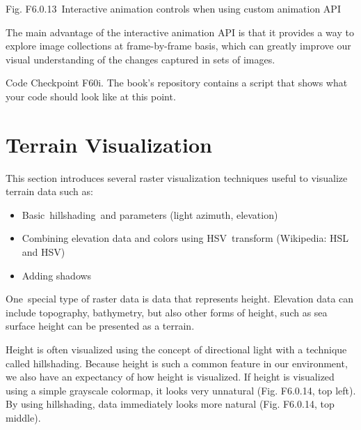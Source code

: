 \documentclass[
  letterpaper,
  DIV=11,
  numbers=noendperiod]{scrreprt}
\providecommand{\tightlist}{%
  \setlength{\itemsep}{0pt}\setlength{\parskip}{0pt}}\usepackage{longtable,booktabs,array}
\begin{document}
Fig. F6.0.13~Interactive animation controls when using custom animation
API

The main advantage of the interactive animation API is that it provides
a way to explore image collections at frame-by-frame basis, which can
greatly improve our visual understanding of the changes captured in sets
of images.

\begin{tcolorbox}[enhanced jigsaw, left=2mm, breakable, rightrule=.15mm, opacityback=0, colframe=quarto-callout-note-color-frame, colbacktitle=quarto-callout-note-color!10!white, arc=.35mm, opacitybacktitle=0.6, toptitle=1mm, colback=white, leftrule=.75mm, title=\textcolor{quarto-callout-note-color}{\faInfo}\hspace{0.5em}{Note}, toprule=.15mm, bottomtitle=1mm, titlerule=0mm, bottomrule=.15mm, coltitle=black]

Code Checkpoint F60i. The book's repository contains a script that shows
what your code should look like at this point.

\end{tcolorbox}

\hypertarget{terrain-visualization}{%
\section{Terrain Visualization}\label{terrain-visualization}}

This section introduces several raster visualization techniques useful
to visualize terrain data such as:

\begin{itemize}
\tightlist
\item
  Basic~hillshading~and parameters (light azimuth, elevation)
\item
  Combining elevation data and colors using HSV~transform (Wikipedia:
  HSL and HSV)
\item
  Adding shadows
\end{itemize}

One~special type of raster data is data that represents height.
Elevation data can include topography, bathymetry, but also other forms
of height, such as sea surface height can be presented as a terrain.

Height is often visualized using the concept of directional light with a
technique called hillshading. Because height is such a common feature in
our environment, we also have an expectancy of how height is visualized.
If height is visualized using a simple grayscale colormap, it looks very
unnatural (Fig. F6.0.14, top left). By using hillshading, data
immediately looks more natural (Fig. F6.0.14, top middle).
\end{document}
